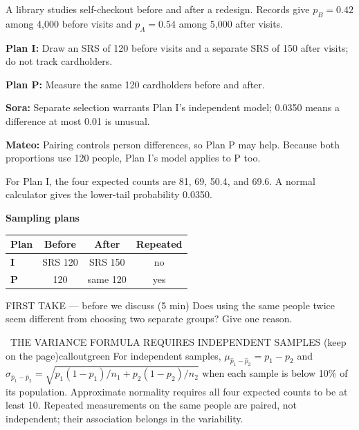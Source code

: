 \documentclass[11pt]{article}
\begin{document}


A library studies self-checkout before and after a redesign. Records give $p_B=0.42$ among 4{,}000 before visits and $p_A=0.54$ among 5{,}000 after visits.\par\smallskip \textbf{Plan I:} Draw an SRS of 120 before visits and a separate SRS of 150 after visits; do not track cardholders.\par \textbf{Plan P:} Measure the same 120 cardholders before and after.\par\smallskip \textbf{Sora:} Separate selection warrants Plan I's independent model; 0.0350 means a difference at most 0.01 is unusual.\par \textbf{Mateo:} Pairing controls person differences, so Plan P may help. Because both proportions use 120 people, Plan I's model applies to P too.\par\smallskip For Plan I, the four expected counts are 81, 69, 50.4, and 69.6. A normal calculator gives the lower-tail probability 0.0350.\par
\begin{center}
\textbf{Sampling plans}\par\smallskip
\begin{tabular}{|l|c|c|c|}
\hline
\textbf{Plan} & \textbf{Before} & \textbf{After} & \textbf{Repeated} \\ \hline
\textbf{I} & SRS 120 & SRS 150 & no \\ \hline
\textbf{P} & 120 & same 120 & yes \\ \hline
\end{tabular}
\end{center}
\begin{firsttakebox}{FIRST TAKE --- before we discuss (5 min)}
Does using the same people twice seem different from choosing two separate groups? Give one reason.
\workspace{0.9in}
\end{firsttakebox}

\begin{callout}{\IconBook\ THE VARIANCE FORMULA REQUIRES INDEPENDENT SAMPLES (keep on the page)}{calloutgreen}
For independent samples, $\mu_{\widehat p_1-\widehat p_2}=p_1-p_2$ and
$\sigma_{\widehat p_1-\widehat p_2}=\sqrt{p_1(1-p_1)/n_1+p_2(1-p_2)/n_2}$ when each sample is
below 10\% of its population. Approximate normality requires all four expected counts to be at least 10.
Repeated measurements on the same people are paired, not independent; their association belongs in the variability.
\end{callout}
\end{document}
